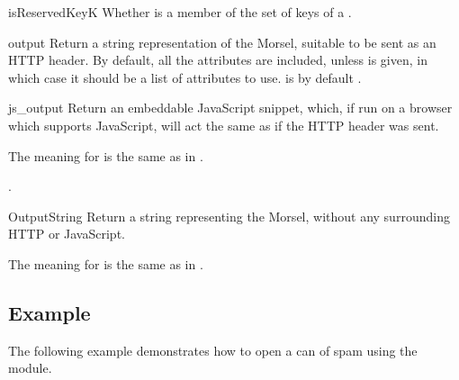 \begin{methoddesc}[Morsel]{isReservedKey}{K}
Whether  is a member of the set of keys of a .
\end{methoddesc}

\begin{methoddesc}[Morsel]{output}{}
Return a string representation of the Morsel, suitable
to be sent as an HTTP header. By default, all the attributes are included,
unless  is given, in which case it should be a list of attributes
to use.  is by default .
\end{methoddesc}

\begin{methoddesc}[Morsel]{js_output}{}
Return an embeddable JavaScript snippet, which, if run on a browser which
supports JavaScript, will act the same as if the HTTP header was sent.

The meaning for  is the same as in .
\end{methoddesc}.

\begin{methoddesc}[Morsel]{OutputString}{}
Return a string representing the Morsel, without any surrounding HTTP
or JavaScript.

The meaning for  is the same as in .
\end{methoddesc}
                

\subsection{Example \label{cookie-example}}

The following example demonstrates how to open a can of spam using the
 module.

